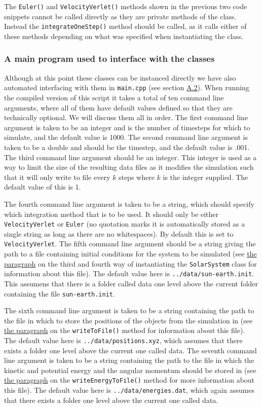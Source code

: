 \documentclass[reprint,english,notitlepage]{revtex4-1}  %
\begin{document}
The \verb+Euler()+ and \verb+VelocityVerlet()+ methods shown in the previous two code snippets cannot be called directly as they are private methods of the class. Instead the \verb+integrateOneStep()+ method should be called, as it calls either of these methods depending on what was specified when instantiating the class.


\subsubsection{A main program used to interface with the classes} \label{sec:III:a:4}

Although at this point these classes can be instanced directly we have also automated interfacing with them in \verb+main.cpp+ (see section \hyperref[A.2]{A.2}). When running the compiled version of this script it takes a total of ten command line arguments, where all of them have default values defined so that they are technically optional. We will discuss them all in order. The first command line argument is taken to be an integer and is the number of timesteps for which to simulate, and the default value is 1000. The second command line argument is taken to be a double and should be the timestep, and the default value is .001. The third command line argument should be an integer. This integer is used as a way to limit the size of the resulting data files as it modifies the simulation such that it will only write to file every $k$ steps where $k$ is the integer supplied. The default value of this is 1. 

The fourth command line argument is taken to be a string, which should specify which integration method that is to be used. It should only be either \verb+VelocityVerlet+ or \verb+Euler+ (no quotation marks it is automatically stored as a single string as long as there are no whitespaces). By default this is set to \verb+VelocityVerlet+. The fifth command line argument should be a string giving the path to a file containing initial conditions for the system to be simulated (see \hyperref[poi:initfile]{the paragraph} on the third and fourth way of instantiating the \verb+SolarSystem+ class for information about this file). The default value here is \verb+../data/sun-earth.init+. This assumens that there is a folder called data one level above the current folder containing the file \verb+sun-earth.init+. 

The sixth command line argument is taken to be a string containing the path to the file in which to store the positions of the objects from the simulation in (see \hyperref[poi:write_to_file]{the paragraph} on the \verb+writeToFile()+ method for information about this file). The default value here is \verb+../data/positions.xyz+, which assumes that there exists a folder one level above the current one called data. The seventh command line argument is taken to be a string containing the path to the file in which the kinetic and potential energy and the angular momentum should be stored in (see \hyperref[poi:write_energy_to_file]{the paragraph} on the \verb+writeEnergyToFile()+ method for more information about this file). The default value here is \verb+../data/energies.dat+, which again assumes that there exists a folder one level above the current one called data. 
\end{document}
